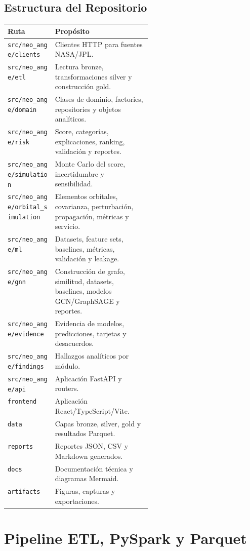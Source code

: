 \documentclass[12pt,a4paper]{report}
\DeclareRobustCommand{\filepath}[1]{\nolinkurl{#1}}
\begin{document}
\section{Estructura del Repositorio}

{\small
\setlength{\tabcolsep}{4pt}
\begin{tabularx}{\linewidth}{>{\RaggedRight\arraybackslash}p{0.33\linewidth}Y}
\toprule
Ruta & Propósito\\
\midrule
\filepath{src/neo_ange/clients} & Clientes HTTP para fuentes NASA/JPL.\\
\filepath{src/neo_ange/etl} & Lectura bronze, transformaciones silver y construcción gold.\\
\filepath{src/neo_ange/domain} & Clases de dominio, factories, repositories y objetos analíticos.\\
\filepath{src/neo_ange/risk} & Score, categorías, explicaciones, ranking, validación y reportes.\\
\filepath{src/neo_ange/simulation} & Monte Carlo del score, incertidumbre y sensibilidad.\\
\filepath{src/neo_ange/orbital_simulation} & Elementos orbitales, covarianza, perturbación, propagación, métricas y servicio.\\
\filepath{src/neo_ange/ml} & Datasets, feature sets, baselines, métricas, validación y leakage.\\
\filepath{src/neo_ange/gnn} & Construcción de grafo, similitud, datasets, baselines, modelos GCN/GraphSAGE y reportes.\\
\filepath{src/neo_ange/evidence} & Evidencia de modelos, predicciones, tarjetas y desacuerdos.\\
\filepath{src/neo_ange/findings} & Hallazgos analíticos por módulo.\\
\filepath{src/neo_ange/api} & Aplicación FastAPI y routers.\\
\filepath{frontend} & Aplicación React/TypeScript/Vite.\\
\filepath{data} & Capas bronze, silver, gold y resultados Parquet.\\
\filepath{reports} & Reportes JSON, CSV y Markdown generados.\\
\filepath{docs} & Documentación técnica y diagramas Mermaid.\\
\filepath{artifacts} & Figuras, capturas y exportaciones.\\
\bottomrule
\end{tabularx}
}

\chapter{Pipeline ETL, PySpark y Parquet}
\end{document}
